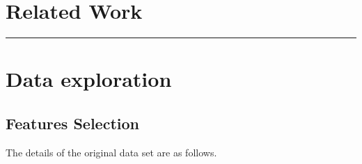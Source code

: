\documentclass[
]{article}
\begin{document}
\hypertarget{related-work}{%
\section{Related Work}\label{related-work}}

\begin{center}\rule{0.5\linewidth}{0.5pt}\end{center}

\hypertarget{data-exploration}{%
\section{Data exploration}\label{data-exploration}}

\hypertarget{features-selection}{%
\subsection{Features Selection}\label{features-selection}}

The details of the original data set are as follows.
\end{document}
